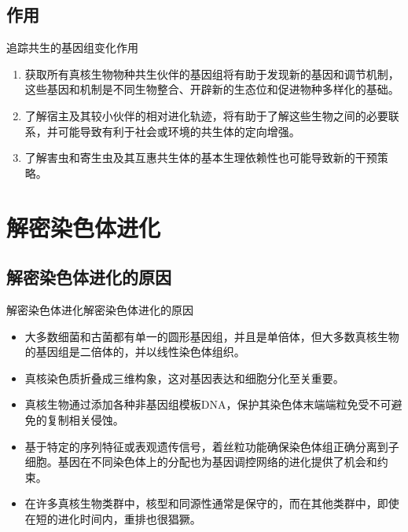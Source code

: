 \documentclass{beamer}
\begin{document}

	\subsection*{作用}
	\begin{frame}{追踪共生的基因组变化}{作用}
		\begin{enumerate}
			\item 获取所有真核生物物种共生伙伴的基因组将有助于发现新的基因和调节机制，这些基因和机制是不同生物整合、开辟新的生态位和促进物种多样化的基础。
			\item 了解宿主及其较小伙伴的相对进化轨迹，将有助于了解这些生物之间的必要联系，并可能导致有利于社会或环境的共生体的定向增强。
			\item 了解害虫和寄生虫及其互惠共生体的基本生理依赖性也可能导致新的干预策略。
		\end{enumerate}
	\end{frame}


	\section{解密染色体进化}
	\subsection*{解密染色体进化的原因}
	\begin{frame}{解密染色体进化}{解密染色体进化的原因}
		\begin{itemize}
			\item 大多数细菌和古菌都有单一的圆形基因组，并且是单倍体，但大多数真核生物的基因组是二倍体的，并以线性染色体组织。
			\item 真核染色质折叠成三维构象，这对基因表达和细胞分化至关重要。
			\item 真核生物通过添加各种非基因组模板DNA，保护其染色体末端端粒免受不可避免的复制相关侵蚀。
			\item 基于特定的序列特征或表观遗传信号，着丝粒功能确保染色体组正确分离到子细胞。基因在不同染色体上的分配也为基因调控网络的进化提供了机会和约束。
			\item 在许多真核生物类群中，核型和同源性通常是保守的，而在其他类群中，即使在短的进化时间内，重排也很猖獗。
		\end{itemize}
	\end{frame}

\end{document}
